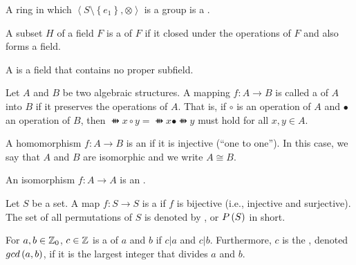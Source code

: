 \begin{defi}[Field]
A ring \soplusotimes in which $\left\langle S\setminus\left\{e_1\right\},\otimes\right\rangle$ is a group is a .
\cite{Oppliger:2011:CC:2049860}
\end{defi}

\begin{defi}[Subfield]
A subset $H$ of a field $F$ is a  of $F$ if it closed under the operations of $F$ and also forms a field.
\cite{Oppliger:2011:CC:2049860}
\end{defi}

\begin{defi}
A  is a field that contains no proper subfield.
\cite{Oppliger:2011:CC:2049860}
\end{defi}

\begin{defi}[Homomorphism]
Let $A$ and $B$ be two algebraic structures. A mapping $f:A\rightarrow B$ is called a  of $A$ into $B$ if it preserves the operations of $A$. That is, if $\circ$ is an operation of $A$ and $\bullet$ an operation of $B$, then $\ffun{x\circ y}=\ffun{x}\bullet\ffun{y}$ must hold for all $x,y\in A$.
\cite{Oppliger:2011:CC:2049860}
\end{defi}

\begin{defi}[Isomorphism]
A homomorphism $f:A\rightarrow B$ is an  if it is injective (``one to one''). In this case, we say that $A$ and $B$ are isomorphic and we write $A\cong B$.
\cite{Oppliger:2011:CC:2049860}
\end{defi}

\begin{defi}[Automorphism]
An isomorphism $f:A\rightarrow A$ is an .
\cite{Oppliger:2011:CC:2049860}
\end{defi}

\begin{defi}[Permutation]
Let $S$ be a set. A map $f:S\rightarrow S$ is a  if $f$ is bijective (i.e., injective and surjective). The set of all permutations of $S$ is denoted by , or $P\left(S\right)$ in short.
\cite{Oppliger:2011:CC:2049860}
\end{defi}

\begin{defi}
For $a,b\in\mathbb{Z}_0$, $c\in\mathbb{Z}$ is a  of $a$ and $b$ if $c|a$ and $c|b$. Furthermore, $c$ is the , denoted $gcd\left(a,b\right)$, if it is the largest integer that divides $a$ and $b$.
\cite{Oppliger:2011:CC:2049860}
\end{defi}

